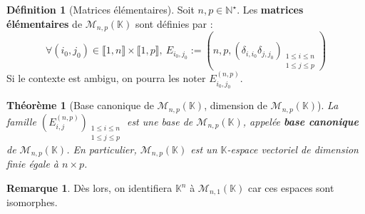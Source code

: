 \documentclass[french]{book}
\newcommand{\N}{\mathbb{N}}
\newcommand{\K}{\mathbb{K}}
\newcommand{\st}{^\star}
\theoremstyle{plain}
\newtheorem{thm}{Théorème}[chapter]
\theoremstyle{definition}
\newtheorem{dfn}{Définition}[chapter]
\newtheorem{rmq}{Remarque}[chapter]
\theoremstyle{remark}
\begin{document}
\begin{dfn}[Matrices élémentaires]
	Soit $n,p\in\N\st$. Les \textbf{matrices élémentaires} de $\mathcal{M}_{n,p}(\K)$ sont définies par : $$\forall(i_0,j_0)\in\llbracket1,n\rrbracket\times\llbracket1,p\rrbracket,\ E_{i_0,j_0}:=\left(n,p,(\delta_{i,i_0}\delta_{j,j_0})_{\substack{1\leqslant i\leqslant n\\ 1\leqslant j\leqslant p}}\right)$$ Si le contexte est ambigu, on pourra les noter $E_{i_0,j_0}^{(n,p)}$.
\end{dfn}
\begin{thm}[Base canonique de $\mathcal{M}_{n,p}(\K)$, dimension de $\mathcal{M}_{n,p}(\K)$]
	La famille $\displaystyle\left(E_{i,j}^{(n,p)}\right)_{\substack{1\leqslant i\leqslant n\\ 1\leqslant j\leqslant p}}$ est une base de $\mathcal{M}_{n,p}(\K)$, appelée \textbf{base canonique} de $\mathcal{M}_{n,p}(\K)$. En particulier, $\mathcal{M}_{n,p}(\K)$ est un $\K$-espace vectoriel de dimension finie égale à $n\times p$.
\end{thm}
\begin{rmq}
	Dès lors, on identifiera $\K^n$ à $\mathcal{M}_{n,1}(\K)$ car ces espaces sont isomorphes.
\end{rmq}
\end{document}
